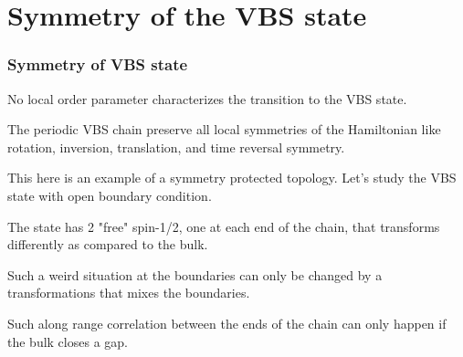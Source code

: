 \documentclass{beamer}
\begin{document}
\section{Symmetry of the VBS state}
\begin{frame}
    \frametitle{Symmetry of VBS state}
    No local order parameter characterizes the transition to the VBS state. \pause

    The periodic VBS chain preserve all local symmetries of the Hamiltonian like rotation, inversion, translation, and time reversal symmetry. 
    \pause 
    
    This here is an example of a symmetry protected topology. 
    Let's study the VBS state with open boundary condition.     
    \begin{center}
    \end{center}
The state has 2 "free" spin-1/2, one at each end of the chain, that transforms differently as compared to the bulk. \pause 

Such a weird situation at the boundaries can only be changed by a transformations that mixes the boundaries. \pause 

Such along range correlation between the ends of the chain can only happen if the bulk closes a gap. 
\end{frame}
\end{document}
